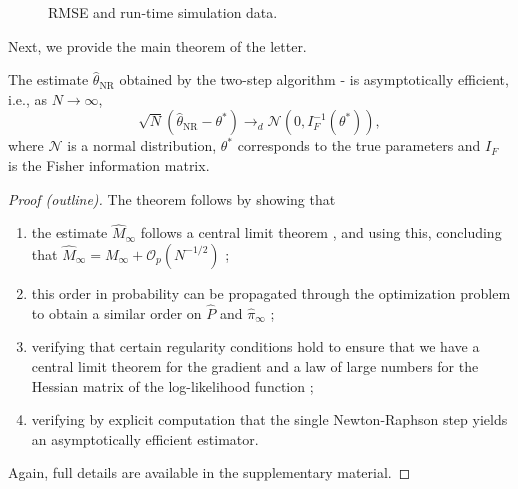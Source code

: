 \documentclass[journal]{IEEEtran}
\newcommand{\hMii}{\hat M_\infty}
\newcommand{\thetaNR}{\hat \theta_\text{NR}}
\newcommand{\Fisher}{I_F}
\begin{document}
\begin{figure*}[ht!]
\begin{subfigure}[]{0.49\linewidth}
    \label{fig:runtime}
\end{subfigure}
    \caption{RMSE and run-time simulation data.}
    \label{fig:numerical}
\end{figure*}

Next, we provide the main theorem of the letter.
\begin{theorem}
    The estimate $\thetaNR$ obtained by the two-step algorithm
    - is asymptotically efficient, i.e., as $N
    \to \infty$,
    \begin{equation}
        \sqrt{N}(\thetaNR - \theta^*) \to_d \mathcal{N}(0, \Fisher^{-1}(\theta^*)),
    \end{equation}
    where $\mathcal{N}$ is a normal distribution, $\theta^*$ corresponds to the
    true parameters and $\Fisher$ is the Fisher information matrix.
    \label{thrm:as_eff}
\end{theorem}
\begin{proof}[Proof (outline)]
    The theorem follows by showing that
    \begin{enumerate}
        \item the estimate $\hat M_\infty$ follows a central limit theorem
            \cite[Corollary 5]{jones_markov_2004}, and
            using this, concluding that $\hMii = M_\infty
            + \mathcal{O}_p(N^{-1/2})$ \cite[Appendix A]{pollard_convergence_1984};
        \item this order in probability can be propagated through the
            optimization problem  to obtain a similar order
            on $\hat P$ and $\hat \pi_\infty$ \cite[Theorem
            2.1]{daniel_stability_1973};
        \item verifying that certain regularity conditions hold to ensure
            that we have a central limit theorem for the gradient and
            a law of large numbers for the Hessian matrix of the log-likelihood
            function \cite[Theorems 12.5.5 and 12.5.6]{cappe_inference_2005};
        \item verifying by explicit computation that the single Newton-Raphson
            step yields an asymptotically efficient estimator.
    \end{enumerate}
    Again, full details are available in the supplementary material.

\end{proof}
\end{document}
